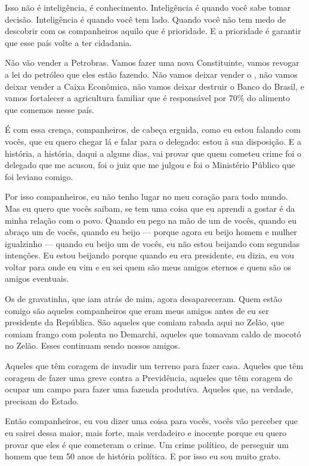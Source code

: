 Isso não é inteligência, é conhecimento. Inteligência é quando
você sabe tomar decisão. Inteligência é quando você tem lado. Quando
você não tem medo de descobrir com os companheiros aquilo que é
prioridade. E a prioridade é garantir que esse país volte a
ter cidadania.

Não vão vender a Petrobras. Vamos fazer uma nova Constituinte,
vamos revogar a lei do petróleo que eles estão fazendo. Não vamos deixar
vender o , não vamos deixar vender a Caixa Econômica, não vamos
deixar destruir o Banco do Brasil, e vamos fortalecer a agricultura
familiar que é responsável por 70\% do alimento que comemos nesse país.

É com essa crença, companheiros, de cabeça erguida, como eu estou
falando com vocês, que eu quero chegar lá e falar para o delegado: estou
à sua disposição. E a história, a história, daqui a alguns dias, vai
provar que quem cometeu crime foi o delegado que me acusou, foi o juiz
que me julgou e foi o Ministério Público que foi leviano comigo.

Por isso companheiros, eu não tenho lugar no meu coração para todo
mundo. Mas eu quero que vocês saibam, se tem uma coisa que eu aprendi a
gostar é da minha relação com o povo. Quando eu pego na mão de um de
vocês, quando eu abraço um de vocês, quando eu beijo --- porque agora
eu beijo homem e mulher igualzinho --- quando eu beijo um de vocês,
eu não estou beijando com segundas intenções. Eu estou beijando porque
quando eu era presidente, eu dizia, eu vou voltar para onde eu vim e eu
sei quem são meus amigos eternos e quem são os amigos eventuais.

Os de gravatinha, que iam atrás de mim, agora desapareceram. Quem
estão comigo são aqueles companheiros que eram meus amigos antes de eu
ser presidente da República. São aqueles que comiam rabada aqui no
Zelão, que comiam frango com polenta no Demarchi, aqueles que tomavam
caldo de mocotó no Zelão. Esses continuam sendo nossos amigos.

Aqueles que têm coragem de invadir um terreno para fazer casa.
Aqueles que têm coragem de fazer uma greve contra a Previdência, aqueles
que têm coragem de ocupar um campo para fazer uma fazenda produtiva.
Aqueles que, na verdade, precisam do Estado.

Então companheiros, eu vou dizer uma coisa para vocês, vocês vão
perceber que eu sairei dessa maior, mais forte, mais verdadeiro e
inocente porque eu quero provar que eles é que cometeram o crime. Um
crime político, de perseguir um homem que tem 50 anos de história
política. E por isso eu sou muito grato.

